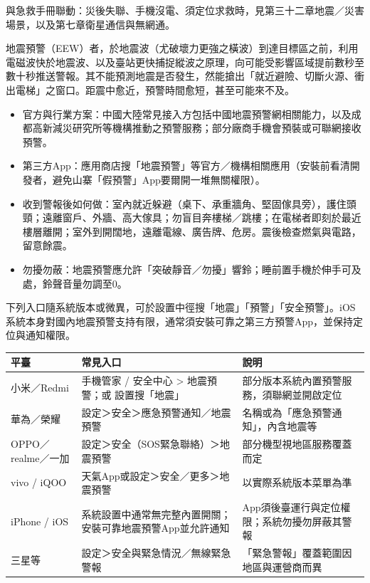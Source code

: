 與急救手冊聯動：災後失聯、手機沒電、須定位求救時，見第三十二章地震／災害場景，以及第七章衛星通信與無網通。


地震預警（EEW）者，於地震波（尤破壞力更強之橫波）到達目標區之前，利用電磁波快於地震波、以及臺站更快捕捉縱波之原理，向可能受影響區域提前數秒至數十秒推送警報。其不能預測地震是否發生，然能搶出「就近避險、切斷火源、衝出電梯」之窗口。距震中愈近，預警時間愈短，甚至可能來不及。

\begin{itemize}
  \item 官方與行業方案：中國大陸常見接入方包括中國地震預警網相關能力，以及成都高新減災研究所等機構推動之預警服務；部分廠商手機會預裝或可聯網接收預警。
  \item 第三方App：應用商店搜「地震預警」等官方／機構相關應用（安裝前看清開發者，避免山寨「假預警」App要爾開一堆無關權限）。
  \item 收到警報後如何做：室內就近躲避（桌下、承重牆角、堅固傢具旁），護住頭頸；遠離窗戶、外牆、高大傢具；勿盲目奔樓梯／跳樓；在電梯者即刻於最近樓層離開；室外到開闊地，遠離電線、廣告牌、危房。震後檢查燃氣與電路，留意餘震。
  \item 勿擾勿蔽：地震預警應允許「突破靜音／勿擾」響鈴；睡前置手機於伸手可及處，鈴聲音量勿調至0。
\end{itemize}


下列入口隨系統版本或微異，可於設置中徑搜「地震」「預警」「安全預警」。iOS系統本身對國內地震預警支持有限，通常須安裝可靠之第三方預警App，並保持定位與通知權限。

\begin{center}
\begin{tabularx}{\linewidth}{|X|X|X|}
\hline
\textbf{平臺} & \textbf{常見入口} & \textbf{說明} \tabularnewline
\hline
小米／Redmi & 手機管家 / 安全中心 > 地震預警；或 設置搜「地震」 & 部分版本系統內置預警服務，須聯網並開啟定位 \tabularnewline
華為／榮耀 & 設定＞安全＞應急預警通知／地震預警 & 名稱或為「應急預警通知」，內含地震等 \tabularnewline
OPPO／realme／一加 & 設定＞安全（SOS緊急聯絡）＞地震預警 & 部分機型視地區服務覆蓋而定 \tabularnewline
vivo / iQOO & 天氣App或設定＞安全／更多＞地震預警 & 以實際系統版本菜單為準 \tabularnewline
iPhone / iOS & 系統設置中通常無完整內置開關；安裝可靠地震預警App並允許通知 & App須後臺運行與定位權限；系統勿擾勿屏蔽其警報 \tabularnewline
三星等 & 設定＞安全與緊急情況／無線緊急警報 & 「緊急警報」覆蓋範圍因地區與運營商而異 \tabularnewline
\hline
\end{tabularx}
\end{center}

